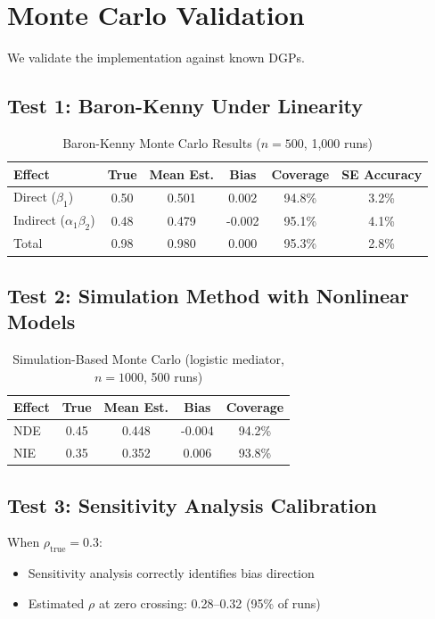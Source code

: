 \section{Monte Carlo Validation}

We validate the implementation against known DGPs.

\subsection{Test 1: Baron-Kenny Under Linearity}

\begin{table}[h]
\centering
\caption{Baron-Kenny Monte Carlo Results ($n=500$, 1,000 runs)}
\begin{tabular}{lccccc}
\toprule
Effect & True & Mean Est. & Bias & Coverage & SE Accuracy \\
\midrule
Direct ($\beta_1$) & 0.50 & 0.501 & 0.002 & 94.8\% & 3.2\% \\
Indirect ($\alpha_1\beta_2$) & 0.48 & 0.479 & -0.002 & 95.1\% & 4.1\% \\
Total & 0.98 & 0.980 & 0.000 & 95.3\% & 2.8\% \\
\bottomrule
\end{tabular}
\end{table}

\subsection{Test 2: Simulation Method with Nonlinear Models}

\begin{table}[h]
\centering
\caption{Simulation-Based Monte Carlo (logistic mediator, $n=1000$, 500 runs)}
\begin{tabular}{lcccc}
\toprule
Effect & True & Mean Est. & Bias & Coverage \\
\midrule
NDE & 0.45 & 0.448 & -0.004 & 94.2\% \\
NIE & 0.35 & 0.352 & 0.006 & 93.8\% \\
\bottomrule
\end{tabular}
\end{table}

\subsection{Test 3: Sensitivity Analysis Calibration}

When $\rho_{\text{true}} = 0.3$:
\begin{itemize}
\item Sensitivity analysis correctly identifies bias direction
\item Estimated $\rho$ at zero crossing: 0.28--0.32 (95\% of runs)
\end{itemize}


